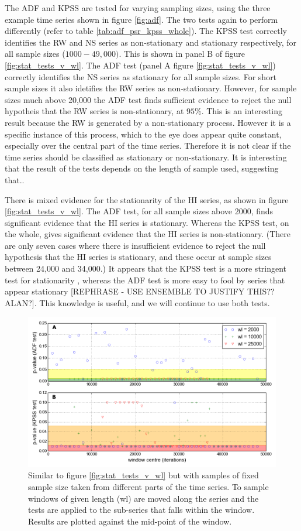 The ADF and KPSS are tested for varying sampling sizes, using the three example time series shown in figure \ref{fig:adf}. The two tests again to perform differently (refer to table \ref{tab:adf_psr_kpss_whole}). The KPSS test correctly identifies the RW and NS series as non-stationary and stationary respectively, for all sample sizes ($1000 - 49,000)$. This is shown in panel B of figure \ref{fig:stat_tests_v_wl}. The ADF test (panel A figure \ref{fig:stat_tests_v_wl}) correctly identifies the NS series as stationary for all sample sizes. For short sample sizes it also idetifies the RW series as non-stationary. However, for sample sizes much above 20,000 the ADF test finds sufficient evidence to reject the null hypotheis that the RW series is non-stationary, at $95\%$. This is an interesting result because the RW is generated by a non-stationary process. However it is a specific instance of this process, which to the eye does appear quite constant, especially over the central part of the time series. Therefore it is not clear if the time series should be classified as stationary or non-stationary. It is interesting that the result of the tests depends on the length of sample used, suggesting that.. 

There is mixed evidence for the stationarity of the HI series, as shown in figure \ref{fig:stat_tests_v_wl}. The ADF test, for all sample sizes above 2000, finds significant evidence that the HI series is stationary. Whereas the KPSS test, on the whole, gives significant evidence that the HI series is non-stationary. (There are only seven cases where there is insufficient evidence to reject the null hypothesis that the HI series is stationary, and these occur at sample sizes between 24,000 and 34,000.) It appears that the KPSS test is a more stringent test for stationarity , whereas the ADF test is more easy to fool by series that appear stationary [REPHRASE - USE ENSEMBLE TO JUSTIFY THIS?? ALAN?]. This knowledge is useful, and we will continue to use both tests.

\begin{figure}[ht!]
	\centering
	\includegraphics[width=0.8\linewidth]{"./chapters/chapter04b/figures/Rtests/stat_tests_v_time"}
     \caption{Similar to figure \ref{fig:stat_tests_v_wl} but with samples of fixed sample size taken from different parts of the time series. To sample windows of given length (wl) are moved along the series and the tests are applied to the sub-series that falls within the window. Results are plotted against the mid-point of the window.}
     \label{fig:stat_tests_v_time}   
\end{figure}

